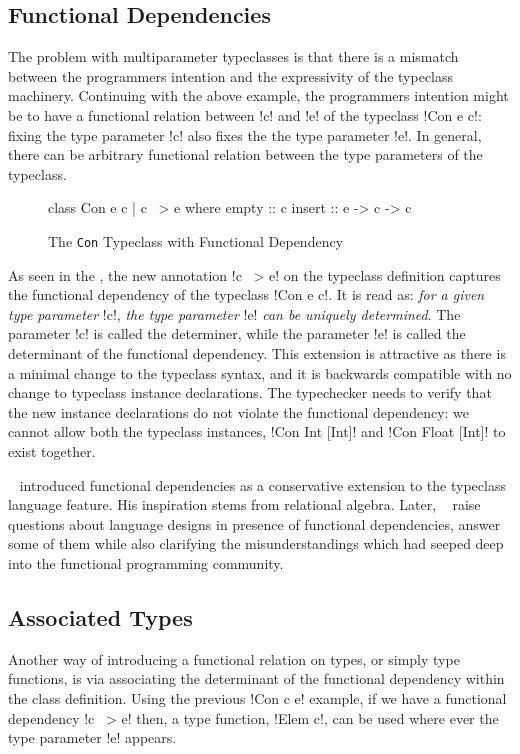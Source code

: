 \documentclass[screen,nonacm,manuscript,review]{acmart} %
\begin{document}
\subsection{Functional Dependencies}
The problem with multiparameter typeclasses is that there is a
mismatch between the programmers intention and the expressivity of the
typeclass machinery. Continuing with the above example, the
programmers intention might be to have a functional relation between !c! and
!e! of the typeclass !Con e c!: fixing the type
parameter !c! also fixes the the type parameter !e!. In general,
there can be arbitrary functional relation between the type parameters
of the typeclass.
\begin{figure}[ht]
\begin{CenteredBox}
\begin{code}
class Con e c | c ~> e where
  empty :: c
  insert :: e -> c -> c
\end{code}
\end{CenteredBox}
\caption[\lstinline{Con} typeclass]{The \lstinline{Con} Typeclass with Functional Dependency}
\label{fig:tc-collection-fd}
\end{figure}
As seen in the , the new annotation !c ~> e!
on the typeclass definition captures the functional dependency of the typeclass
!Con e c!. It is read as: \emph{for a given type parameter} !c!,
\emph{the type parameter} !e! \emph{can be uniquely
determined}. The parameter !c! is called the determiner, while
the parameter !e! is called the determinant of the
functional dependency. This extension is attractive
as there is a minimal change to the typeclass syntax, and it is
backwards compatible with no change to typeclass instance declarations.
The typechecker needs to verify that the new instance declarations do
not violate the functional dependency: we cannot allow both the typeclass instances,
!Con Int [Int]! and !Con Float [Int]! to exist together.

~\citet{jones_tcfd_2000} introduced functional dependencies as a
conservative extension to the typeclass language feature. His
inspiration stems from relational algebra. Later,
~\citet{jones_language_2008} raise questions about language designs in
presence of functional dependencies, answer some of them while also
clarifying the misunderstandings which had seeped deep into the
functional programming community.

\subsection{Associated Types}
Another way of introducing a functional relation on types, or simply
type functions, is via associating the determinant of the
functional dependency within the class definition.
Using the previous !Con c e! example, if we have a functional
dependency !c ~> e! then, a type function, !Elem c!, can be used where ever
the type parameter !e! appears.
\end{document}
